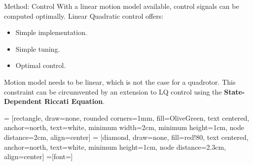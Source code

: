         \begin{frame}{Method: Control}
            With a linear motion model available, control signals can be computed optimally.
            Linear Quadratic control offers:
            \begin{itemize}
                \item Simple implementation.
                \item Simple tuning.
                \item Optimal control.
            \end{itemize}
            Motion model needs to be linear, which is not the case for a quadrotor.
            This constraint can be circumvented by an extension to LQ control using the
            \textbf{State-Dependent Riccati Equation}.
        \end{frame}

     = [rectangle, draw=none, rounded corners=1mm, fill=OliveGreen,
                    text centered, anchor=north, text=white, minimum width=2cm, minimum height=1cm, node distance=2cm, align=center]
     = [diamond, draw=none, fill=red!80,
                    text centered, anchor=north, text=white, minimum height=1cm, node distance=2.3cm, align=center]
    =[font=\scriptsize]

